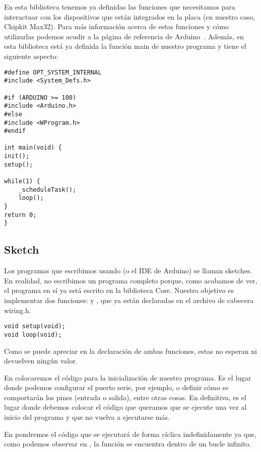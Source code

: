 En esta biblioteca tenemos ya definidas las funciones que necesitamos para interactuar con los dispositivos que están integrados en la placa (en nuestro caso, Chipkit Max32). Para más información acerca de estas funciones y cómo utilizarlas podemos acudir a la página de referencia de Arduino~\cite{website:arduino_funcs}. Además, en esta biblioteca está ya definida la función main de nuestro programa y tiene el siguiente aspecto:

\lstset{language=C++}
\begin{lstlisting}[caption=main.cpp]
#define OPT_SYSTEM_INTERNAL
#include <System_Defs.h>

#if (ARDUINO >= 100)
#include <Arduino.h>
#else
#include <WProgram.h>
#endif

int main(void) {
init();
setup();

while(1) {
	_scheduleTask();
	loop();
}
return 0;
}
\end{lstlisting}

\subsection{Sketch}
Los programas que escribimos usando  (o el IDE de Arduino) se llaman sketches. En realidad, no escribimos un programa completo porque, como acabamos de ver, el programa en sí ya está escrito en la biblioteca Core. Nuestro objetivo es implementar dos funciones:  y , que ya están declaradas en el archivo de cabecera wiring.h.

\begin{lstlisting}[caption=Sección de wiring.h]
void setup(void);
void loop(void);
\end{lstlisting}

Como se puede apreciar en la declaración de ambas funciones, estas no esperan ni devuelven ningún valor.


En  colocaremos el código para la inicialización de nuestro programa. Es el lugar donde podemos configurar el puerto serie, por ejemplo, o definir cómo se comportarán los pines (entrada o salida), entre otras cosas. En definitiva, es el lugar donde debemos colocar el código que queramos que se ejecute una vez al inicio del programa y que no vuelva a ejecutarse más.

En  pondremos el código que se ejecutará de forma cíclica indefinidamente ya que, como podemos observar en , la función  se encuentra dentro de un bucle infinito.

